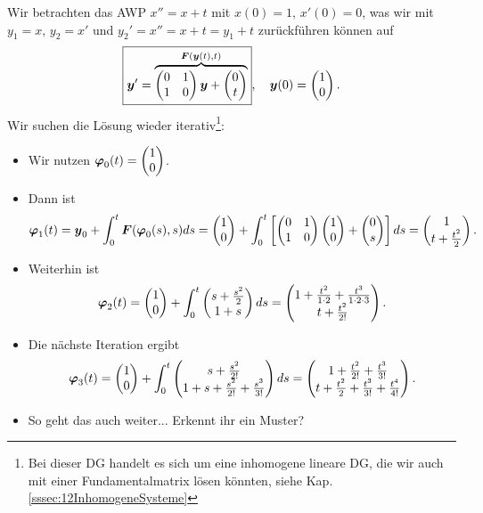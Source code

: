 \begin{Beispiel}
Wir betrachten das AWP $x''=x+t$ mit $x(0)=1,\,x'(0)=0$, was wir mit $y_1=x,\,y_2=x'$ und $y_2'=x''=x+t=y_1+t$ zurückführen können auf
\begin{equation*}
    \boxed{{{\text{\boldmath${y}$}}}'=\overbrace{\begin{pmatrix}0&1\\1&0\end{pmatrix}{{\text{\boldmath${y}$}}}+\begin{pmatrix}0\\t\end{pmatrix}}^{{{\text{\boldmath${F}$}}}({{\text{\boldmath${y}$}}}(t),t)}},\quad {{\text{\boldmath${y}$}}}(0)=\begin{pmatrix}1\\0\end{pmatrix}.
\end{equation*}
Wir suchen die Lösung wieder iterativ\footnote{Bei dieser DG handelt es sich um eine inhomogene lineare DG, die wir auch mit einer Fundamentalmatrix lösen könnten, siehe Kap. \ref{sssec:12InhomogeneSysteme}}:
\begin{itemize}
    \item Wir nutzen ${{\text{\boldmath${\varphi}$}}}_0(t)=\begin{pmatrix}1\\0\end{pmatrix}$.
    \item Dann ist
    \begin{equation*}
        {{\text{\boldmath${\varphi}$}}}_1(t)={{\text{\boldmath${y}$}}}_0+\int_0^t{{\text{\boldmath${F}$}}}({{\text{\boldmath${\varphi}$}}}_0(s),s)ds=\begin{pmatrix}1\\0\end{pmatrix}+\int_0^t\left[{\begin{pmatrix}0&1\\1&0\end{pmatrix}\begin{pmatrix}1\\0\end{pmatrix}+\begin{pmatrix}0\\s\end{pmatrix}}\right]ds=\begin{pmatrix}1\\t+\frac{t^2}{2}\end{pmatrix}.
    \end{equation*}
    \item Weiterhin ist
    \begin{equation*}
        {{\text{\boldmath${\varphi}$}}}_2(t)=\begin{pmatrix}1\\0\end{pmatrix}+\int_0^t\begin{pmatrix}s+\frac{s^2}{2}\\1+s\end{pmatrix}ds=\begin{pmatrix}1+\frac{t^2}{1\cdot 2}+\frac{t^3}{1\cdot2\cdot3}\\t+\frac{t^2}{2!}\end{pmatrix}.
    \end{equation*}
    \item Die nächste Iteration ergibt
    \begin{equation*}
        {{\text{\boldmath${\varphi}$}}}_3(t)=\begin{pmatrix}1\\0\end{pmatrix}+\int_0^t\begin{pmatrix}s+\frac{s^2}{2!}\\1+s+\frac{s^2}{2!}+\frac{s^3}{3!}\end{pmatrix}ds=\begin{pmatrix}1+\frac{t^2}{2!}+\frac{t^3}{3!}\\t+\frac{t^2}{2}+\frac{t^3}{3!}+\frac{t^4}{4!}\end{pmatrix}.
    \end{equation*}
    \item So geht das auch weiter... Erkennt ihr ein Muster?
\end{itemize}

\end{Beispiel}
